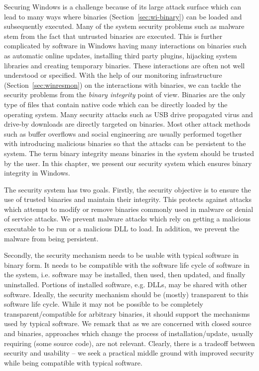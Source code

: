Securing Windows is a challenge because of its large
attack surface which can lead to many ways where
binaries (Section~\ref{sec:wi-binary}) can be loaded and subsequently executed.
Many of the system security problems such as malware
stem from the fact that untrusted binaries are executed.
This is further complicated by
software in Windows having many interactions on binaries such as
automatic online updates, installing third party plugins,
hijacking system libraries and creating temporary binaries.
These interactions are often not well understood or specified.
With the help of our monitoring infrastructure (Section~\ref{sec:winresmon})
on the interactions with binaries,
we can tackle the security problems from the {\em binary integrity}
point of view.
Binaries are the only type of files that contain native code which
can be directly loaded by the operating system.
Many security attacks such as USB drive propagated virus and
drive-by downloads are directly targeted on binaries.
Most other attack methods such as buffer overflows and social engineering
are usually performed together with introducing malicious binaries
so that the attacks can be persistent to the system.
The term binary integrity means binaries in the system should be
trusted by the user.
In this chapter, we present our security system which ensures
binary integrity in Windows.

The security system has two goals. Firstly, the security objective
is to ensure the use of trusted binaries and maintain their integrity.
This protects against attacks which attempt to modify or remove binaries
commonly used in malware or denial of service attacks.
We prevent malware attacks which rely on
getting a malicious executable to be run or
a malicious DLL to load.
In addition, we prevent the malware from being persistent.

Secondly, the security mechanism needs to be usable with typical
software in binary form.
It needs to be compatible with the software life cycle of software in the
system, i.e.
software may be installed, then used, then updated, and 
finally uninstalled. 
Portions of installed software, e.g. DLLs,
may be shared with other software. 
Ideally, the security mechanism should be (mostly) transparent to 
this software life cycle.
While it may not be possible to be completely transparent/compatible 
for arbitrary binaries, it should support the mechanisms used 
by typical software.
We remark that as we are concerned with
closed source and binaries,
approaches which change the process of installation/update,
usually requiring (some source code), are not relevant.
Clearly, there is a tradeoff between security and usability --
we seek a practical middle ground with improved security while
being compatible with typical software.

